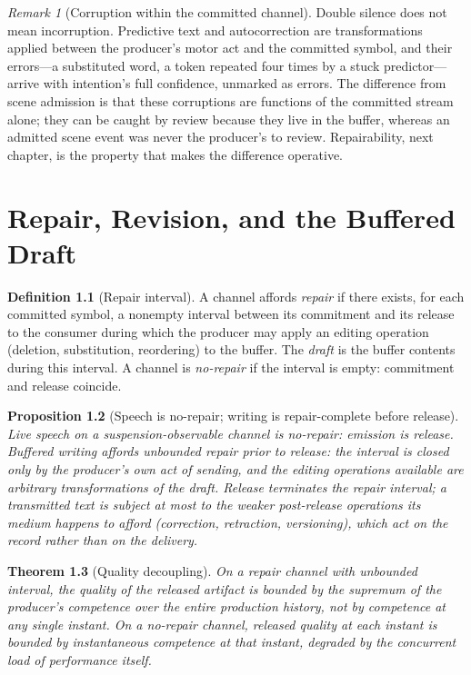 \documentclass[11pt,oneside]{book}
\theoremstyle{plain}
\newtheorem{theorem}{Theorem}[chapter]
\newtheorem{proposition}[theorem]{Proposition}
\theoremstyle{definition}
\newtheorem{definition}[theorem]{Definition}
\theoremstyle{remark}
\newtheorem{remark}[theorem]{Remark}
\begin{document}
\begin{remark}[Corruption within the committed channel]
Double silence does not mean incorruption. Predictive text and autocorrection are transformations applied between the producer's motor act and the committed symbol, and their errors---a substituted word, a token repeated four times by a stuck predictor---arrive with intention's full confidence, unmarked as errors. The difference from scene admission is that these corruptions are functions of the committed stream alone; they can be caught by review because they live in the buffer, whereas an admitted scene event was never the producer's to review. Repairability, next chapter, is the property that makes the difference operative.
\end{remark}

\chapter{Repair, Revision, and the Buffered Draft}

\begin{definition}[Repair interval]
A channel affords \emph{repair} if there exists, for each committed symbol, a nonempty interval between its commitment and its release to the consumer during which the producer may apply an editing operation (deletion, substitution, reordering) to the buffer. The \emph{draft} is the buffer contents during this interval. A channel is \emph{no-repair} if the interval is empty: commitment and release coincide.
\end{definition}

\begin{proposition}[Speech is no-repair; writing is repair-complete before release]
Live speech on a suspension-observable channel is no-repair: emission is release. Buffered writing affords unbounded repair \emph{prior to release}: the interval is closed only by the producer's own act of sending, and the editing operations available are arbitrary transformations of the draft. Release terminates the repair interval; a transmitted text is subject at most to the weaker post-release operations its medium happens to afford (correction, retraction, versioning), which act on the record rather than on the delivery.
\end{proposition}

\begin{theorem}[Quality decoupling]
On a repair channel with unbounded interval, the quality of the released artifact is bounded by the supremum of the producer's competence over the entire production history, not by competence at any single instant. On a no-repair channel, released quality at each instant is bounded by instantaneous competence at that instant, degraded by the concurrent load of performance itself.
\end{theorem}
\end{document}
